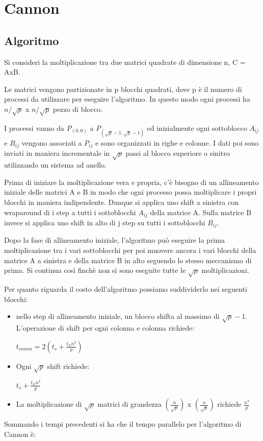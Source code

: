 \chapter{Cannon}
\section{Algoritmo}

Si consideri la moltiplicazione tra due matrici quadrate di dimensione n, C = AxB.

Le matrici vengono partizionate in p blocchi quadrati, dove p \`{e} il numero di processi da utilizzare per eseguire l'algoritmo. In questo modo ogni processi ha $n/\sqrt{p}$ x $n/\sqrt{p}$ pezzo di blocco.

I processi vanno da $P_{(0,0)}$ a $P_{(\sqrt{p}-1, \sqrt{p}-1)}$ ed inizialmente ogni sottoblocco $A_{ij}$ e $B_{ij}$ vengono associati a $P_{ij}$ e sono organizzati in righe e colonne. I dati poi sono inviati in maniera incrementale in $\sqrt{p}$ passi al blocco superiore o sinitro utilizzando un sistema ad anello.

Prima di iniziare la moltiplicazione vera e propria, c'\`{e} bisogno di un allineamento iniziale delle matrici A e B in modo che ogni processo possa moltiplicare i propri blocchi in maniera indipendente. Dunque si applica uno shift a sinistra con wraparound di i step a tutti i sottoblocchi $A_{ij}$ della matrice A.
Sulla matrice B invece si applica uno shift in alto di j step su tutti i sottoblocchi $B_{ij}$.

Dopo la fase di allineamento iniziale, l'algoritmo pu\`{o} eseguire la prima moltiplicazione tra i vari sottoblocchi per poi muovere ancora i vari blocchi della matrice A a sinistra e della matrice B in alto seguendo lo stesso meccanismo di prima. Si continua cos\`{i} finch\`{e} non si sono eseguite tutte le $\sqrt{p}$ moltiplicazioni.

Per quanto riguarda il costo dell'algoritmo possiamo suddividerlo nei seguenti blocchi:
\begin{itemize}
    \item nello step di allineamento iniziale, un blocco shifta al massimo di $\sqrt{p}-1$. L'operazione di shift per ogni colonna e colonna richiede:

    $t_{comm} = 2(t_s + \frac{t_wn^2}{p})$
    \item Ogni $\sqrt{p}$ shift richiede:

    $t_s + \frac{t_wn^2}{p}$

    \item La moltiplicazione di $\sqrt{p}$ matrici di grandezza $(\frac{n}{\sqrt{p}})$ x $(\frac{n}{\sqrt{p}})$ richiede $\frac{n^3}{p}$
\end{itemize}
Sommando i tempi precedenti si ha che il tempo parallelo per l'algoritmo di Cannon \`{e}:

